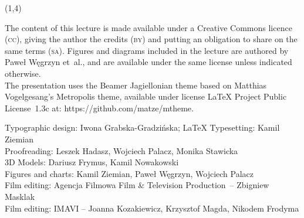 {\begin{frame}[standout]
\begin{textblock}{4.2}
    \end{textblock}





    \begin{textblock}{11}(1,4)

      \begin{flushleft}

        \mdseries

        \footnotesize

        \RaggedRight

        \color{jFrametitleFGColor}

        The content of this lecture is made available under a Creative
        Commons licence (\textsc{cc}), giving the author the credits
        (\textsc{by}) and putting an obligation to share on the same terms
        (\textsc{sa}). Figures and diagrams included in the lecture are
        authored by Paweł Węgrzyn et~al., and are available under the same
        license unless indicated otherwise. \\ The presentation uses the
        Beamer Jagiellonian theme based on Matthias Vogelgesang’s
        Metropolis theme, available under license \LaTeX{} Project
        Public License~1.3c at: 
        {https://github.com/matze/mtheme}.

        Typographic design: Iwona Grabska-Gradzińska;
        \LaTeX{} Typesetting: Kamil Ziemian \\
        Proofreading: Leszek Hadasz, Wojciech Palacz,
        Monika Stawicka \\
        3D Models: Dariusz Frymus, Kamil Nowakowski \\
        Figures and charts: Kamil Ziemian, Paweł Węgrzyn,
        Wojciech Palacz \\
        Film editing: Agencja Filmowa Film \& Television Production~--
        Zbigniew Masklak \\
        Film editing: IMAVI -- Joanna Kozakiewicz, Krzysztof Magda, Nikodem
        Frodyma


      \end{flushleft}

    \end{textblock}

  \end{frame}





  \begin{frame}[standout]


    \begingroup

    \color{jFrametitleFGColor}

    #1

    \endgroup

  \end{frame}
}
